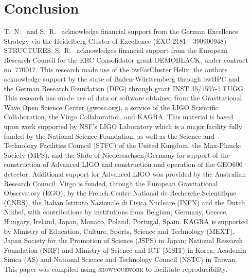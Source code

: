 \documentclass[twocolumn]{aastex631}
\begin{document}
\section{Conclusion}
\label{sec:conclusion}

\begin{acknowledgments}
T.~N.~ and S.~R.~ acknowledge financial support from the German Excellence Strategy via the Heidelberg Cluster of Excellence (EXC 2181 - 390900948) STRUCTURES.
S.~R.~ acknowledges financial support from the European Research Council for the ERC Consolidator grant DEMOBLACK, under contract no. 770017. 
This research made use of the bwForCluster Helix: the authors acknowledge support by the state of Baden-Württemberg through bwHPC and the German Research Foundation (DFG) through grant INST 35/1597-1 FUGG.
This research has made use of data or software obtained from the Gravitational Wave Open Science Center (gwosc.org), a service of the LIGO Scientific Collaboration, the Virgo Collaboration, and KAGRA. This material is based upon work supported by NSF's LIGO Laboratory which is a major facility fully funded by the National Science Foundation, as well as the Science and Technology Facilities Council (STFC) of the United Kingdom, the Max-Planck-Society (MPS), and the State of Niedersachsen/Germany for support of the construction of Advanced LIGO and construction and operation of the GEO600 detector. Additional support for Advanced LIGO was provided by the Australian Research Council. Virgo is funded, through the European Gravitational Observatory (EGO), by the French Centre National de Recherche Scientifique (CNRS), the Italian Istituto Nazionale di Fisica Nucleare (INFN) and the Dutch Nikhef, with contributions by institutions from Belgium, Germany, Greece, Hungary, Ireland, Japan, Monaco, Poland, Portugal, Spain. KAGRA is supported by Ministry of Education, Culture, Sports, Science and Technology (MEXT), Japan Society for the Promotion of Science (JSPS) in Japan; National Research Foundation (NRF) and Ministry of Science and ICT (MSIT) in Korea; Academia Sinica (AS) and National Science and Technology Council (NSTC) in Taiwan.
This paper was compiled using \textsc{showyourwork} \cite{Luger2021} to facilitate reproducibility.
\end{acknowledgments}


\end{document}
